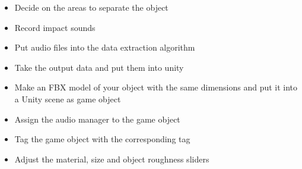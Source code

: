 \begin{itemize}
\item Decide on the areas to separate the object
\item Record impact sounds
\item Put audio files into the data extraction algorithm
\item Take the output data and put them into unity
\item Make an FBX\textsuperscript{\textregistered} model of your object with the same dimensions and put it into a Unity\textsuperscript{\textregistered} scene as game object
\item Assign the audio manager to the game object
\item Tag the game object with the corresponding tag
\item Adjust the material, size and object roughness sliders
\end{itemize}



